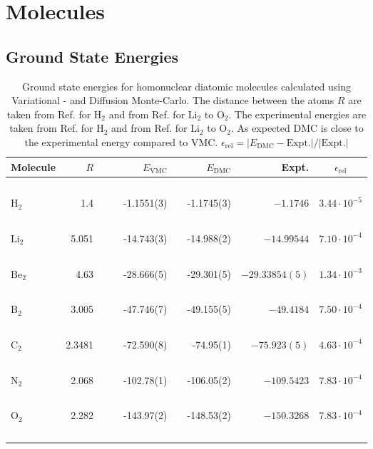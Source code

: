 \section{Molecules}

\subsection{Ground State Energies}
 
\begin{table}
\begin{center}
\begin{tabular}{lrccrlrrc}
Molecule & $R$ & & \qquad & $E_\mathrm{VMC}$ & & \qquad $E_\mathrm{DMC}$ & \qquad\,\, Expt. & \qquad $\epsilon_\mathrm{rel}$\\
\hline\hline
\ \\
$\mathrm{H_2}$ & 1.4   & &\qquad & -1.1551(3)    & \qquad   & -1.1745(3)   & \qquad $-1.1746$      & \qquad $3.44\cdot 10^{-5}$ \\
\ \\
$\mathrm{Li_2}$& 5.051 & &\qquad & -14.743(3)    & \qquad   & -14.988(2)   & \qquad $-14.99544$    & \qquad $7.10\cdot 10^{-4}$ \\
\ \\
$\mathrm{Be_2}$& 4.63  & &\qquad & -28.666(5)    & \qquad   & -29.301(5)   & \qquad $-29.33854(5)$ & \qquad $1.34\cdot 10^{-3}$  \\
\ \\
$\mathrm{B_2}$ & 3.005 & &\qquad & -47.746(7)    & \qquad   & -49.155(5)   & \qquad $-49.4184$     & \qquad $7.50\cdot 10^{-4}$  \\
\ \\
$\mathrm{C_2}$ & 2.3481& &\qquad & -72.590(8)    & \qquad   & -74.95(1)    & \qquad $-75.923(5)$   & \qquad $4.63\cdot 10^{-4}$  \\
\ \\
$\mathrm{N_2}$ & 2.068 & &\qquad & -102.78(1)    & \qquad   & -106.05(2)   & \qquad $-109.5423$    & \qquad $7.83\cdot 10^{-4}$  \\
\ \\
$\mathrm{O_2}$ & 2.282 & &\qquad & -143.97(2)    & \qquad   & -148.53(2)   & \qquad $-150.3268$    & \qquad $7.83\cdot 10^{-4}$  \\
\ \\
\end{tabular}
\caption{Ground state energies for homonuclear diatomic molecules calculated using Variational - and Diffusion Monte-Carlo. The distance between the atoms $R$ are taken from Ref. \cite{H_He_exact} for $\mathrm{H_2}$ and from Ref. \cite{UmrigarMolecules} for $\mathrm{Li_2}$ to $\mathrm{O_2}$. The experimental energies are taken from Ref. \cite{H_He_exact} for $\mathrm{H_2}$ and from Ref. \cite{ExactMolecules} for $\mathrm{Li_2}$ to $\mathrm{O_2}$. As expected DMC is close to the experimental energy compared to VMC. $\epsilon_\mathrm{rel} = |E_\mathrm{DMC} - \mathrm{Expt.}|/|\mathrm{Expt.}|$}
\label{tab:AtomsRes}
\end{center}
\end{table}


